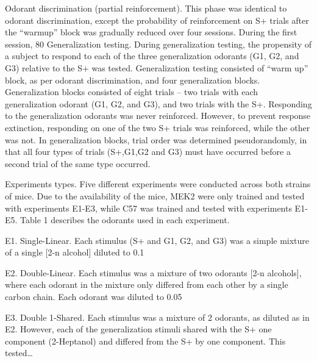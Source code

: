 Odorant discrimination (partial reinforcement).
This phase was identical to odorant discrimination, except the probability of reinforcement on S+ trials after the “warmup” block was gradually reduced over four sessions. During the first session, 80%
Generalization testing.
            During generalization testing, the propensity of a subject to respond to each of the three generalization odorants (G1, G2, and G3) relative to the S+ was tested. Generalization testing consisted of “warm up” block, as per odorant discrimination, and four generalization blocks. Generalization blocks consisted of eight trials – two trials with each generalization odorant (G1, G2, and G3), and two trials with the S+. Responding to the generalization odorants was never reinforced. However, to prevent response extinction, responding on one of the two S+ trials was reinforced, while the other was not. In generalization blocks, trial order was determined pseudorandomly, in that all four types of trials (S+,G1,G2 and G3) must have occurred before a second trial of the same type occurred.

Experiments types.
Five different experiments were conducted across both strains of mice. Due to the availability of the mice, MEK2 were only trained and tested with experiments E1-E3, while C57 was trained and tested with experiments E1-E5.  Table 1 describes the odorants used in each experiment.

E1. Single-Linear. Each stimulus (S+ and G1, G2, and G3) was a simple mixture of a single [2-n alcohol] diluted to 0.1%

E2. Double-Linear. Each stimulus was a mixture of two odorants [2-n alcohols], where each odorant in the mixture only differed from each other by a single carbon chain. Each odorant was diluted to 0.05%

E3. Double 1-Shared. Each stimulus was a mixture of 2 odorants, as diluted as in E2. However, each of the generalization stimuli shared with the S+ one component (2-Heptanol) and differed from the S+ by one component. This tested…

